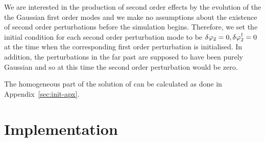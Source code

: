 We are interested in the production of second order effects by the
evolution of the the Gaussian first order modes and we make no
assumptions about the existence of second order perturbations before
the simulation begins. Therefore, we set the initial condition for each second order
perturbation mode to be $\delta\varphi_{2}=0, \delta\varphi_{2}^{\dagger}=0$ at
the time when the corresponding first order perturbation is initialised.
In addition, the perturbations in the far past are supposed to have been purely Gaussian and
so at this time the second order perturbation would be zero. 
% 

The homogeneous part of the solution of
 can be calculated as done in Appendix~\ref{sec:init-apx}. 


  

\section{Implementation} 
\label{sec:impl-num}


